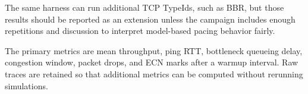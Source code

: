 The same harness can run additional TCP TypeIds, such as BBR, but those results should be reported as an extension unless the campaign includes enough repetitions and discussion to interpret model-based pacing behavior fairly.

The primary metrics are mean throughput, ping RTT, bottleneck queueing delay, congestion window, packet drops, and ECN marks after a warmup interval. Raw traces are retained so that additional metrics can be computed without rerunning simulations.
